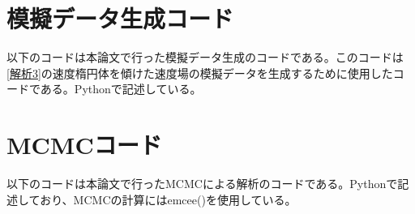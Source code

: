 
\section{模擬データ生成コード}
以下のコードは本論文で行った模擬データ生成のコードである。このコードは\ref{解析3}の速度楕円体を傾けた速度場の模擬データを生成するために使用したコードである。Pythonで記述している。


\section{MCMCコード}
以下のコードは本論文で行ったMCMCによる解析のコードである。Pythonで記述しており、MCMCの計算にはemcee(\cite{Foreman2013})を使用している。
